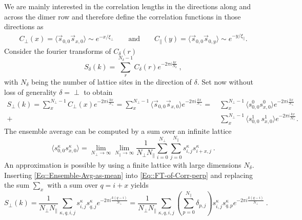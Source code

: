 	We are mainly interested in the correlation lengths in the directions along and across the dimer row and therefore define the correlation functions in those directions as	
	\begin{align} \label{Eq::Corr-Func-asymptotic}
		C_\perp(x) =  \langle \vec{s}_{0,0} \vec{s}_{x, 0} \rangle \sim e^{-x /	\xi_\perp} \qquad \text{and} \qquad
		C_\parallel(y) =  \langle \vec{s}_{0,0} \vec{s}_{0, y} \rangle \sim e^{-y /	\xi_\parallel}.
	\end{align}
	Consider the fourier transforms of $C_\delta(r)$
	\begin{equation}  \label{Eq::FT-Corr-delta}
		S_\delta(k) = \sum_r^{N_\delta - 1} C_\delta (r) e^{-2\pi i \frac{kr}{N_\delta}}~,	
	\end{equation}
	with $N_\delta$ being the number of lattice sites in the direction of $\delta$. Set now without loss of generality $\delta =	\perp$ to obtain
	\begin{equation} \label{Eq::FT-of-Corr-perp}
		\begin{split}
			S_\perp(k) = \sum_x^{N_\perp - 1} C_\perp (x) e^{-2\pi i \frac{kx}{N_\perp}} =\sum_x^{N_\perp - 1} \langle \vec{s}_{0,0} \vec{s}_{x, 0} \rangle e^{-2\pi i \frac{kx}{N_\perp}} = ~&\sum_x^{N_\perp - 1} \langle s^0_{0,0} s_{x, 0}^0 \rangle e^{-2\pi i \frac{kx}{N_\perp}} \\
			+&\sum_x^{N_\perp - 1} \langle s_{0,0}^1  \
			s_{x, 0}^1 \rangle e^{-2\pi i \frac{kx}{N_\perp}}.
		\end{split}				
	\end{equation}
	The ensemble average can be computed by a sum over an infinite lattice
	\begin{equation} \label{Eq::Ensemble-Avg-as-mean}
		\langle s^\kappa_{0,0} s_{x, 0}^\kappa \rangle =	\lim\limits_{N_\perp \rightarrow \infty} \lim\limits_{N_\parallel \rightarrow \infty} \frac{1}{N_\perp N_\parallel} \sum_{i =	0}^{N_\perp} \sum_{j=0}^{N_\parallel}   s^\kappa_{i,j} s_{i + x, j}^\kappa~. 
	\end{equation}
	An approximation is possible by using a finite lattice with large dimensions $N_\delta$. Inserting \autoref{Eq::Ensemble-Avg-as-mean} into \autoref{Eq::FT-of-Corr-perp} and replacing the sum $\sum_x$ with a sum over $q =	i +x$ yields
	\begin{equation} \label{Eq::FT-Corr-Delta}
		S_\perp(k) = \frac{1}{N_\perp N_\parallel}  \sum_{\kappa,q,i,j}^{}   s^\kappa_{i,j} s_{q, j}^\kappa e^{-2\pi i \frac{k(q-i)}{N_\perp}} =	\frac{1}{N_\perp N_\parallel}  \sum_{\kappa,q,i,j}^{}  \left(\sum_{p=0}^{N_\parallel} \delta_{p,j} \right) s^\kappa_{i,j} s_{q, p}^\kappa e^{-2\pi i \frac{k(q-i)}{N_\perp}}~.
	\end{equation}
